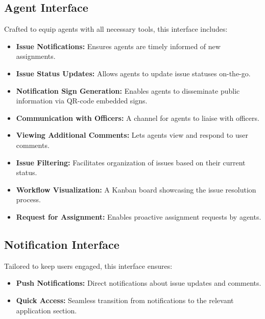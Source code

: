 \subsection{Agent Interface}
    Crafted to equip agents with all necessary tools, this interface includes:
    
    \begin{itemize}
        \item \textbf{Issue Notifications:} Ensures agents are timely informed of new assignments.
        \item \textbf{Issue Status Updates:} Allows agents to update issue statuses on-the-go.
        \item \textbf{Notification Sign Generation:} Enables agents to disseminate public information via QR-code embedded signs.
        \item \textbf{Communication with Officers:} A channel for agents to liaise with officers.
        \item \textbf{Viewing Additional Comments:} Lets agents view and respond to user comments.
        \item \textbf{Issue Filtering:} Facilitates organization of issues based on their current status.
        \item \textbf{Workflow Visualization:} A \gls{Kanban board} showcasing the issue resolution process.
        \item \textbf{Request for Assignment:} Enables proactive assignment requests by agents.
    \end{itemize}

\subsection{Notification Interface}
    Tailored to keep users engaged, this interface ensures:
    
    \begin{itemize}
        \item \textbf{Push Notifications:} Direct notifications about issue updates and comments.
        \item \textbf{Quick Access:} Seamless transition from notifications to the relevant application section.
    \end{itemize}

